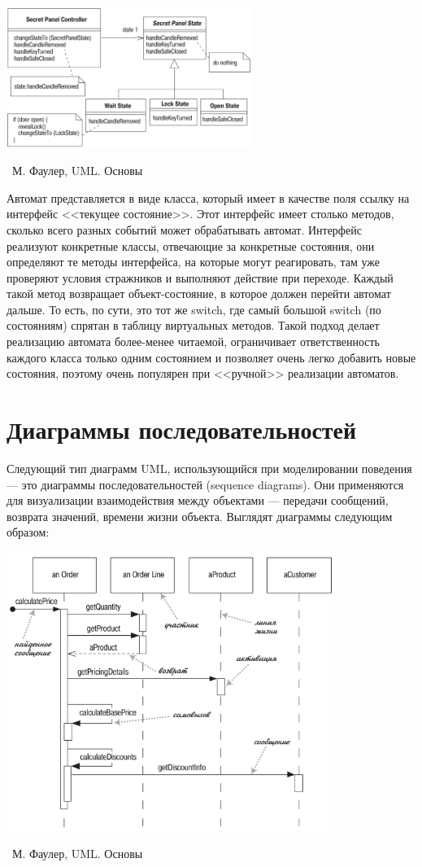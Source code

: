\documentclass[a5paper]{article}
\newcommand{\attribution}[1] {
	\vspace{-5mm}\begin{flushright}\begin{scriptsize}%
	{\textcopyright\, #1}\end{scriptsize}\end{flushright}
}
\begin{document}
\begin{center}
	\includegraphics[width=0.6\textwidth]{stateTransitionStatePattern.png}
	\attribution{М. Фаулер, UML. Основы}
\end{center}

Автомат представляется в виде класса, который имеет в качестве поля ссылку на интерфейс <<текущее состояние>>. Этот интерфейс имеет столько методов, сколько всего разных событий может обрабатывать автомат. Интерфейс реализуют конкретные классы, отвечающие за конкретные состояния, они определяют те методы интерфейса, на которые могут реагировать, там уже проверяют условия стражников и выполняют действие при переходе. Каждый такой метод возвращает объект-состояние, в которое должен перейти автомат дальше. То есть, по сути, это тот же switch, где самый большой switch (по состояниям) спрятан в таблицу виртуальных методов. Такой подход делает реализацию автомата более-менее читаемой, ограничивает ответственность каждого класса только одним состоянием и позволяет очень легко добавить новые состояния, поэтому очень популярен при <<ручной>> реализации автоматов.

\section{Диаграммы последовательностей}

Следующий тип диаграмм UML, использующийся при моделировании поведения --- это диаграммы последовательностей (sequence diagrams). Они применяются для визуализации взаимодействия между объектами --- передачи сообщений, возврата значений, времени жизни объекта. Выглядят диаграммы следующим образом:

\begin{center}
	\includegraphics[width=0.8\textwidth]{sequenceDiagramSyntax.png}
	\attribution{М. Фаулер, UML. Основы}
\end{center}
\end{document}
